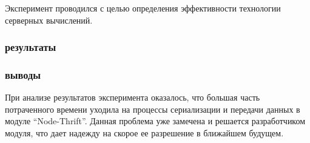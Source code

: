 Эксперимент проводился с целью определения эффективности технологии серверных
вычислений.

\subsubsection{результаты}
\begin{table}[ht]
\caption{Серверные вычисления, 3G}
\begin{center}
\end{center}
\label{table:nonlin}
\end{table}

\subsubsection{выводы}

При анализе результатов эксперимента оказалось, что большая часть потраченного
времени уходила на процессы сериализации и передачи данных в модуле
``Node-Thrift''. Данная проблема уже замечена и решается разработчиком модуля,
что дает надежду на скорое ее разрешение в ближайшем будущем.

